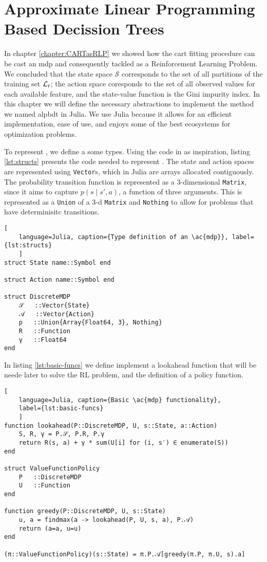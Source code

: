 \chapter{Approximate Linear Programming Based Decission Trees}
\label{chapter:ALPBDT}

In chapter \ref{chapter:CARTasRLP} we showed how the \ac{cart} fitting procedure
can be cast an \ac{mdp} and consequently tackled as a Reinforcement Learning
Problem. We concluded that the state space $\mathcal{S}$ corresponds to the set
of all partitions of the training set $\mathcal{L}_t$; the action space coresponds to the
set of all observed values for each available feature, and the state-value
function is the Gini impurity index. In this chapter we will define the
necessary abstractions to implement the method we named \acf{alpbdt} in Julia.
We use Julia because it allows for an efficient implementation, ease of use, and
enjoys some of the best ecosystems for optimization problems.

To represent , we define a some types. Using the code in
\cite{kochenderfer2022} as inspiration, listing \ref{lst:structs} presents the
code needed to represent . The state and action spaces are represented
using \lstinline{Vector}s, which in Julia are arrays allocated contiguously. The
probability transition function is represented as a 3-dimensional
\lstinline{Matrix}, since it aims to capture $p(s \mid s', a)$, a function of
three arguments. This is represented as a \lstinline{Union} of a 3-d
\lstinline{Matrix} and \lstinline{Nothing} to allow for problems that have
determinisitc transitions.

\begin{lstlisting}[
    language=Julia, caption={Type definition of an \ac{mdp}}, label={lst:structs}
    ]
struct State name::Symbol end

struct Action name::Symbol end

struct DiscreteMDP
    𝒮   ::Vector{State}
    𝒜   ::Vector{Action}
    p   ::Union{Array{Float64, 3}, Nothing}
    R   ::Function
    γ   ::Float64
end
\end{lstlisting}

In listing \ref{lst:basic-funcs} we define implement a lookahead function that
will be neede later to solve the RL problem, and the definition of a policy
function.

\begin{lstlisting}[
    language=Julia, caption={Basic \ac{mdp} functionality},
    label={lst:basic-funcs}
    ]
function lookahead(P::DiscreteMDP, U, s::State, a::Action)
    S, R, γ = P.𝒮, P.R, P.γ
    return R(s, a) + γ * sum(U[i] for (i, s′) ∈ enumerate(S))
end

struct ValueFunctionPolicy
    P   ::DiscreteMDP
    U   ::Function
end

function greedy(P::DiscreteMDP, U, s::State)
    u, a = findmax(a -> lookahead(P, U, s, a), P.𝒜)
    return (a=a, u=u)
end

(π::ValueFunctionPolicy)(s::State) = π.P.𝒜[greedy(π.P, π.U, s).a]
\end{lstlisting}

